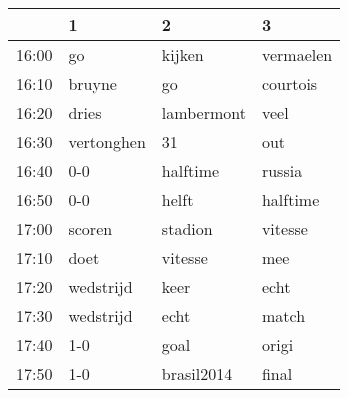 \begin{table}[ht]
\centering
\begin{tabular}{rlll}
  \hline
 & 1 & 2 & 3 \\ 
  \hline
16:00 & go & kijken & vermaelen \\ 
  16:10 & bruyne & go & courtois \\ 
  16:20 & dries & lambermont & veel \\ 
  16:30 & vertonghen & 31 & out \\ 
  16:40 & 0-0 & halftime & russia \\ 
  16:50 & 0-0 & helft & halftime \\ 
  17:00 & scoren & stadion & vitesse \\ 
  17:10 & doet & vitesse & mee \\ 
  17:20 & wedstrijd & keer & echt \\ 
  17:30 & wedstrijd & echt & match \\ 
  17:40 & 1-0 & goal & origi \\ 
  17:50 & 1-0 & brasil2014 & final \\ 
   \hline
\end{tabular}
\end{table}
